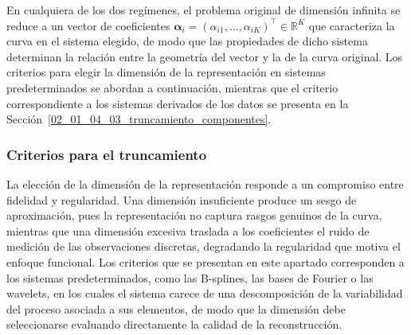 En cualquiera de los dos regímenes, el problema original de dimensión infinita se reduce a un vector de coeficientes $\boldsymbol{\alpha}_i = (\alpha_{i1}, \dots, \alpha_{iK})^\top \in \mathbb{R}^K$ que caracteriza la curva en el sistema elegido, de modo que las propiedades de dicho sistema determinan la relación entre la geometría del vector y la de la curva original. Los criterios para elegir la dimensión de la representación en sistemas predeterminados se abordan a continuación, mientras que el criterio correspondiente a los sistemas derivados de los datos se presenta en la Sección~\ref{02_01_04_03_truncamiento_componentes}.

\subsubsection{Criterios para el truncamiento}
\label{02_01_01_01_criterios_truncamiento_representacion}
La elección de la dimensión de la representación responde a un compromiso entre fidelidad y regularidad. Una dimensión insuficiente produce un sesgo de aproximación, pues la representación no captura rasgos genuinos de la curva, mientras que una dimensión excesiva traslada a los coeficientes el ruido de medición de las observaciones discretas, degradando la regularidad que motiva el enfoque funcional. Los criterios que se presentan en este apartado corresponden a los sistemas predeterminados, como las B-splines, las bases de Fourier o las wavelets, en los cuales el sistema carece de una descomposición de la variabilidad del proceso asociada a sus elementos, de modo que la dimensión debe seleccionarse evaluando directamente la calidad de la reconstrucción.\\

